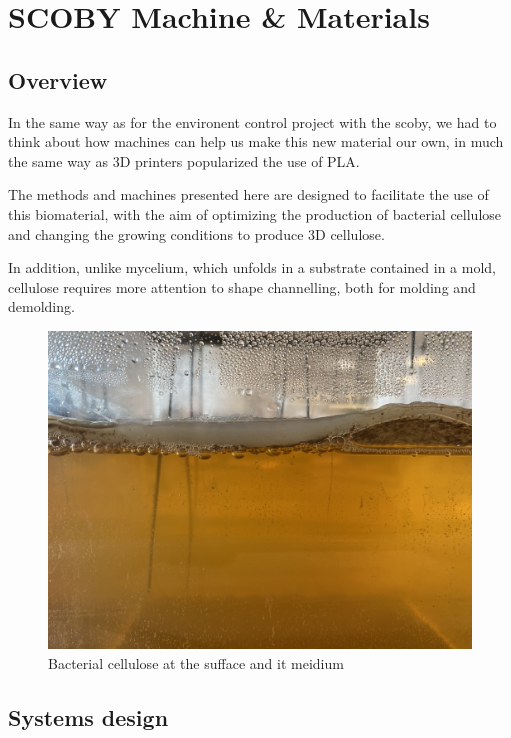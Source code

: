 \chapter{SCOBY Machine \& Materials}


\section{Overview}

In the same way as for the environent control project with the scoby, we had to think about how machines can help us make this new material our own, in much the same way as 3D printers popularized the use of PLA. 

The methods and machines presented here are designed to facilitate the use of this biomaterial, with the aim of optimizing the production of bacterial cellulose and changing the growing conditions to produce 3D cellulose. 

In addition, unlike mycelium, which unfolds in a substrate contained in a mold, cellulose requires more attention to shape channelling, both for molding and demolding. 

\begin{figure}[h]
    \centering
    \includegraphics{images/IMG_4126.jpg}
    \caption{Bacterial cellulose at the sufface and it meidium}
    \label{fig:n;tyrf}
\end{figure} 

\section{Systems design}


